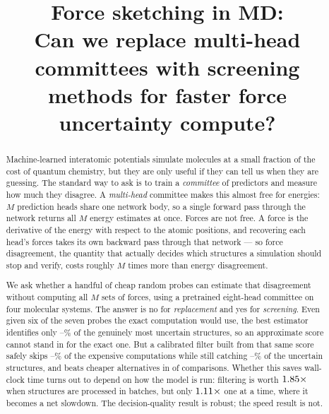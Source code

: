 \documentclass{article}
\title{Force sketching in MD:\\
Can we replace multi-head committees with screening\\
methods for faster force uncertainty compute?}
\author{}
\begin{document}
\maketitle

\begin{abstract}
Machine-learned interatomic potentials simulate molecules at a small fraction of the cost of quantum
chemistry, but they are only useful if they can tell us when they are guessing. The standard way to
ask is to train a \emph{committee} of predictors and measure how much they disagree. A
\emph{multi-head} committee makes this almost free for energies: $M$ prediction heads share one
network body, so a single forward pass through the network returns all $M$ energy estimates at once.
Forces are not free. A force is the derivative of the energy with respect to the atomic positions,
and recovering each head's forces takes its own backward pass through that network --- so force
disagreement, the quantity that actually decides which structures a simulation should stop and
verify, costs roughly $M$ times more than energy disagreement.

We ask whether a handful of cheap random probes can estimate that disagreement without computing all
$M$ sets of forces, using a pretrained eight-head committee on four molecular systems. The answer is
no for \emph{replacement} and yes for \emph{screening}. Even given six of the seven probes the exact
computation would use, the best estimator identifies only
\fsMaxRecallKSixLoPct--\fsMaxRecallKSixHiPct\% of the genuinely most uncertain structures, so an
approximate score cannot stand in for the exact one. But a calibrated filter built from that same
score safely skips \fsGateCVSkipLoPct--\fsGateCVSkipHiPct\% of the expensive computations while
still catching \fsGateCVRecallLoPct--\fsGateCVRecallHiPct\% of the uncertain structures, and beats
cheaper
alternatives in \fsGateCVDominates{} of \fsGateCVComparisons{} comparisons. Whether this saves
wall-clock time turns out to depend on how the model is run: filtering is worth
$1.85\times$ when structures are processed in batches, but only
$1.11\times$ one at a time, where it becomes a net slowdown. The decision-quality
result is robust; the speed result is not.
\end{abstract}
\end{document}
